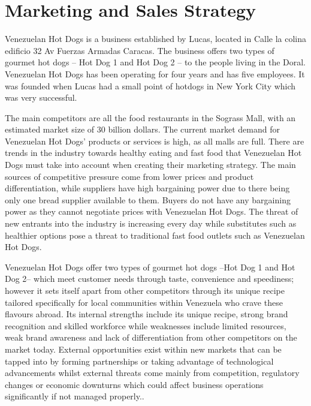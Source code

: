 

\section{Marketing and Sales Strategy}\label{sec:marketing-sales}
Venezuelan Hot Dogs is a business established by Lucas, located in Calle la colina edificio 32 Av Fuerzas Armadas Caracas. The business offers two types of gourmet hot dogs – Hot Dog 1 and Hot Dog 2 – to the people living in the Doral. Venezuelan Hot Dogs has been operating for four years and has five employees. It was founded when Lucas had a small point of hotdogs in New York City which was very successful. 

The main competitors are all the food restaurants in the Sograss Mall, with an estimated market size of 30 billion dollars. The current market demand for Venezuelan Hot Dogs’ products or services is high, as all malls are full. There are trends in the industry towards healthy eating and fast food that Venezuelan Hot Dogs must take into account when creating their marketing strategy. The main sources of competitive pressure come from lower prices and product differentiation, while suppliers have high bargaining power due to there being only one bread supplier available to them. Buyers do not have any bargaining power as they cannot negotiate prices with Venezuelan Hot Dogs. The threat of new entrants into the industry is increasing every day while substitutes such as healthier options pose a threat to traditional fast food outlets such as Venezuelan Hot Dogs. 

Venezuelan Hot Dogs offer two types of gourmet hot dogs –Hot Dog 1 and Hot Dog 2– which meet customer needs through taste, convenience and speediness; however it sets itself apart from other competitors through its unique recipe tailored specifically for local communities within Venezuela who crave these flavours abroad. Its internal strengths include its unique recipe, strong brand recognition and skilled workforce while weaknesses include limited resources, weak brand awareness and lack of differentiation from other competitors on the market today. External opportunities exist within new markets that can be tapped into by forming partnerships or taking advantage of technological advancements whilst external threats come mainly from competition, regulatory changes or economic downturns which could affect business operations significantly if not managed properly.. 

